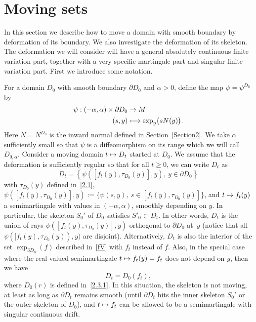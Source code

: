 \documentclass[JEP,XML,SOM,Unicode,NoFloatCountersInSection,published]{cedram}
\newcommand\mto{\mathchoice{\longmapsto}{\mapsto}{\mapsto}{\mapsto}}
\theoremstyle{plain}
\theoremstyle{definition}
\let\a\alpha
\let\pa\partial
\begin{document}
\section{Moving sets}
\label{Section3}

In this section we describe how to move a domain with smooth boundary by defor\-mation of its boundary. We also investigate the deformation of its skeleton. The deformation we will consider will have a general absolutely continuous finite variation part, together with a very specific martingale part and singular finite variation part. First we introduce some notation.

For a domain $D_0$ with smooth boundary $\partial D_0$ and $\a>0$, define the map $\psi=\psi^{D_0}$ by
\begin{equation}
\begin{split}
\psi: (-\a,\a)\times \partial D_0&\to M\\
(s, y)&\mto \exp_y\bigl(sN(y)\bigr).
\end{split}
\end{equation}
Here $N=N^{D_0}$ is the inward normal defined in Section~\ref{Section2}. We take $\a$ sufficiently small so that $\psi$ is a diffeomorphism on its range which we will call $D_{0,\a}$.
Consider a moving domain $t\mto D_t$ started at $D_0$.
We assume that the deformation is sufficiently regular so that
for all $t\ge 0$, we can write $D_t$ as
\begin{equation}
D_t=\left\{\psi([f_t(y),\tau_{D_0}(y)],y),\ y\in \partial D_0\right\}
\end{equation}
with $\tau_{D_0}(y)$ defined in~\eqref{2.1},
$\psi([f_t(y),\tau_{D_0}(y)],y):=\{\psi(s,y),\ s \in [f_t(y),\tau_{D_0}(y)]\}$,
and
$t\mto f_t(y)$ a semimartingale with values in $(-\a,\a)$, smoothly depending on $y$.
{In particular, the skeleton $S_0'$ of $D_0$ satisfies $S'_0\subset D_t$.}
In other words, $D_t$ is the union of rays $\psi([f_t(y),\tau_{D_0}(y)],y)$ orthogonal to $\partial D_0$ at~$y$ (notice that all $\psi([f_t(y),\tau_{D_0}(y)),y)$ are disjoint). Alternatively, $D_t$ is also the interior of the set $\exp_{\partial D_0} (f)$ described in~\eqref{fV} with $f_t$ instead of $f$.
Also, in the special case where the real valued semimartingale $t\mto f_t(y)=f_t$ does not depend on $y$, then we have
\begin{equation}
\label{3.3}
D_t=D_0(f_t),
\end{equation}
where $D_0(r)$ is defined in~\eqref{2.3.1}. In this situation, the skeleton is not moving, at least as long as $\pa D_t$ remains smooth {(\ie until $\pa D_t$ hits the inner skeleton $S_0'$ {or the outer skeleton of $D_0$}),} and $t\mto f_t$ can be allowed to be a semimartingale with singular continuous drift.
\end{document}
